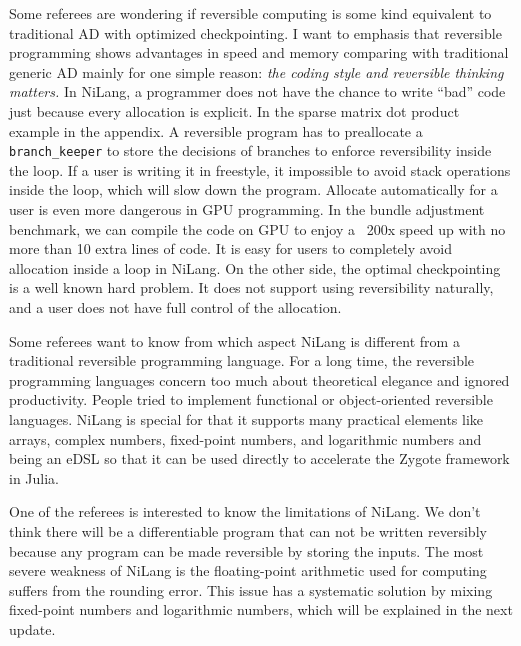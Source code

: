\documentclass{article}
\begin{document}
Some referees are wondering if reversible computing is some kind equivalent to traditional AD with optimized checkpointing.
I want to emphasis that reversible programming shows advantages in speed and memory comparing with traditional generic AD mainly for one simple reason: \textit{the coding style and reversible thinking matters.}
In NiLang, a programmer does not have the chance to write ``bad'' code just because every allocation is explicit.
In the sparse matrix dot product example in the appendix.
A reversible program has to preallocate a \texttt{branch\_keeper} to store the decisions of branches to enforce reversibility inside the loop.
If a user is writing it in freestyle, it impossible to avoid stack operations inside the loop, which will slow down the program.
Allocate automatically for a user is even more dangerous in GPU programming.
In the bundle adjustment benchmark,
we can compile the code on GPU to enjoy a ~200x speed up with no more than 10 extra lines of code.
It is easy for users to completely avoid allocation inside a loop in NiLang.
On the other side, the optimal checkpointing is a well known hard problem. It does not support using reversibility naturally, and a user does not have full control of the allocation.


Some referees want to know from which aspect NiLang is different from a traditional reversible programming language.
For a long time, the reversible programming languages concern too much about theoretical elegance and ignored productivity. People tried to implement functional or object-oriented reversible languages.
NiLang is special for that it supports many practical elements like arrays, complex numbers, fixed-point numbers, and logarithmic numbers and being an eDSL so that it can be used directly to accelerate the Zygote framework in Julia.

One of the referees is interested to know the limitations of NiLang. We don't think there will be a differentiable program that can not be written reversibly because any program can be made reversible by storing the inputs. The most severe weakness of NiLang is the floating-point arithmetic used for computing suffers from the rounding error.
This issue has a systematic solution by mixing fixed-point numbers and logarithmic numbers, which will be explained in the next update.
\end{document}
